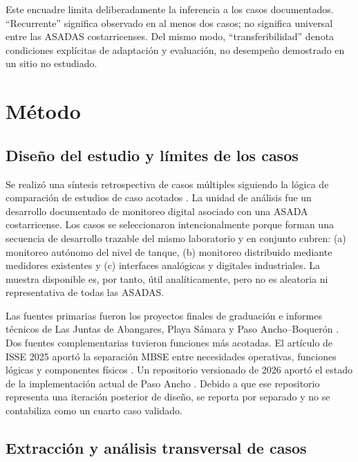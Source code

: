 \documentclass[conference]{IEEEtran}
\begin{document}
Este encuadre limita deliberadamente la inferencia a los casos documentados. ``Recurrente'' significa observado en al menos dos casos; no significa universal entre las ASADAS costarricenses. Del mismo modo, ``transferibilidad'' denota condiciones explícitas de adaptación y evaluación, no desempeño demostrado en un sitio no estudiado.

\section{Método}

\subsection{Diseño del estudio y límites de los casos}

Se realizó una síntesis retrospectiva de casos múltiples siguiendo la lógica de comparación de estudios de caso acotados \cite{yin2018case}. La unidad de análisis fue un desarrollo documentado de monitoreo digital asociado con una ASADA costarricense. Los casos se seleccionaron intencionalmente porque forman una secuencia de desarrollo trazable del mismo laboratorio y en conjunto cubren: (a) monitoreo autónomo del nivel de tanque, (b) monitoreo distribuido mediante medidores existentes y (c) interfaces analógicas y digitales industriales. La muestra disponible es, por tanto, útil analíticamente, pero no es aleatoria ni representativa de todas las ASADAS.

Las fuentes primarias fueron los proyectos finales de graduación e informes técnicos de Las Juntas de Abangares, Playa Sámara y Paso Ancho--Boquerón \cite{chavarria2021implementacion,solorzano2021sistema,oviedo2024desarrollo}. Dos fuentes complementarias tuvieron funciones más acotadas. El artículo de ISSE 2025 aportó la separación MBSE entre necesidades operativas, funciones lógicas y componentes físicos \cite{arguedas2025towards}. Un repositorio versionado de 2026 aportó el estado de la implementación actual de Paso Ancho \cite{deltalabo2026repo}. Debido a que ese repositorio representa una iteración posterior de diseño, se reporta por separado y no se contabiliza como un cuarto caso validado.

\subsection{Extracción y análisis transversal de casos}
\end{document}
